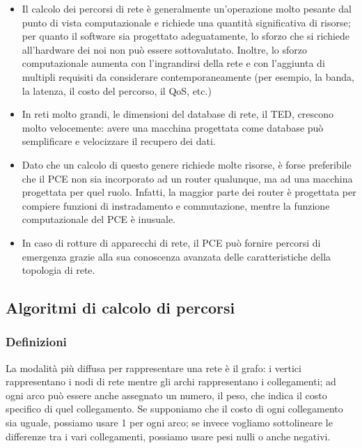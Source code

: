 \documentclass[10pt,a4paper]{report}
\begin{document}
\begin{itemize}
\item Il calcolo dei percorsi di rete è generalmente un'operazione
  molto pesante dal punto di vista computazionale e richiede una
  quantità significativa di risorse; per quanto il software sia
  progettato adeguatamente, lo sforzo che si richiede all'hardware dei
  noi non può essere sottovalutato. Inoltre, lo sforzo computazionale
  aumenta con l'ingrandirsi della rete e con l'aggiunta di multipli
  requisiti da considerare contemporaneamente (per esempio, la banda,
  la latenza, il costo del percorso, il QoS, etc.)
\item In reti molto grandi, le dimensioni del database di rete, il
  TED, crescono molto velocemente: avere una macchina progettata come
  database può semplificare e velocizzare il recupero dei dati.
\item Dato che un calcolo di questo genere richiede molte risorse, è
  forse preferibile che il PCE non sia incorporato ad un router
  qualunque, ma ad una macchina progettata per quel ruolo. Infatti, la
  maggior parte dei router è progettata per compiere funzioni di
  instradamento e commutazione, mentre la funzione computazionale del
  PCE è inusuale.
\item In caso di rotture di apparecchi di rete, il PCE può fornire
  percorsi di emergenza grazie alla sua conoscenza avanzata delle
  caratteristiche della topologia di rete.
\end{itemize}

\subsection*{Algoritmi di calcolo di percorsi}

\subsubsection*{Definizioni}

La modalità più diffusa per rappresentare una rete è il grafo: i
vertici rappresentano i nodi di rete mentre gli archi rappresentano i
collegamenti; ad ogni arco può essere anche assegnato un numero, il
peso, che indica il costo specifico di quel collegamento. Se
supponiamo che il costo di ogni collegamento sia uguale, possiamo
usare 1 per ogni arco; se invece vogliamo sottolineare le differenze
tra i vari collegamenti, possiamo usare pesi nulli o anche negativi.
\end{document}
